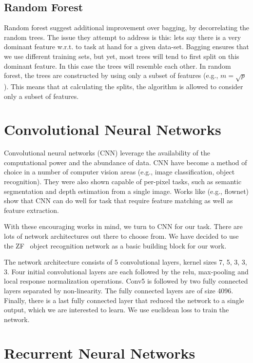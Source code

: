 \documentclass{article}
\begin{document}
\subsection{Random Forest}
Random forest suggest additional improvement over bagging, by
decorrelating the random trees.  The issue they attempt to address is
this: lets say there is a very dominant feature w.r.t. to task at hand
for a given data-set.  Bagging ensures that we use different training
sets, but yet, most trees will tend to first split on this dominant
feature.  In this case the trees will resemble each other.  In random
forest, the trees are constructed by using only a subset of features
(e.g., $m = \sqrt{p}$).  This means that at calculating the splits,
the algorithm is allowed to consider only a subset of features.

\section{Convolutional Neural Networks}

Convolutional neural networks (CNN) leverage the availability of the
computational power and the abundance of data.  CNN have become a
method of choice in a number of computer vision areas (e.g., image
classification, object recognition).  They were also shown capable of
per-pixel tasks, such as semantic segmentation and depth estimation
from a single image. Works like (e.g., flownet) show that CNN can do
well for task that require feature matching as well as feature
extraction.

With these encouraging works in mind, we turn to CNN for our task.
There are lots of network architectures out there to choose from. We
have decided to use the ZF~\cite{DBLP:journals/corr/ZeilerF13} object
recognition network as a basic building block for our work.

The network architecture consists of 5 convolutional layers, kernel
sizes 7, 5, 3, 3, 3.  Four initial convolutional layers are each
followed by the relu, max-pooling and local response normalization
operations.  Conv5 is followed by two fully connected layers separated
by non-linearity.  The fully connected layers are of size
4096. Finally, there is a last fully connected layer that reduced the
network to a single output, which we are interested to learn.  We use
euclidean loss to train the network.

\section{Recurrent Neural Networks}
\end{document}
